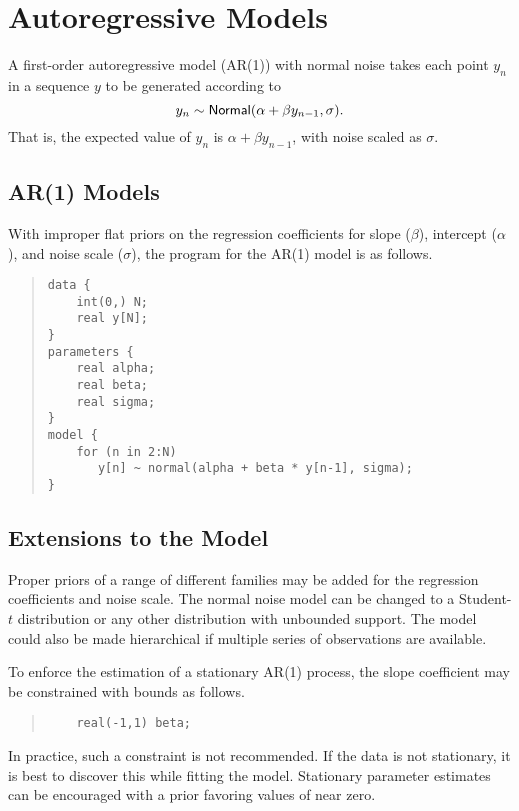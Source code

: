 \section{Autoregressive Models}

A first-order autoregressive model (AR(1)) with normal noise takes
each point $y_n$ in a sequence $y$ to be generated according to
%
\[
y_n \sim \mbox{\sf Normal}(\alpha + \beta y_{n-1}, \sigma).
\]
%
That is, the expected value of $y_n$ is $\alpha + \beta y_{n-1}$, with
noise scaled as $\sigma$.

\subsection{AR(1) Models}

With improper flat priors on the regression coefficients for slope
($\beta$), intercept ($\alpha$), and noise scale ($\sigma$),
the \Stan program for the AR(1) model is as follows.
%
\begin{quote}
\begin{Verbatim}
data {
    int(0,) N;
    real y[N];
}
parameters {
    real alpha;
    real beta;
    real sigma;
}
model {
    for (n in 2:N)
       y[n] ~ normal(alpha + beta * y[n-1], sigma);
}
\end{Verbatim}
\end{quote}
%

\subsection{Extensions to the Model} 

Proper priors of a range of different families may be added for the
regression coefficients and noise scale.  The normal noise model can
be changed to a Student-$t$ distribution or any other distribution
with unbounded support.  The model could also be made hierarchical if
multiple series of observations are available.  

To enforce the estimation of a stationary AR(1) process, the slope
coefficient  may be constrained with bounds as follows.
%
\begin{quote}
\begin{Verbatim}
    real(-1,1) beta;
\end{Verbatim}
\end{quote}
%
In practice, such a constraint is not recommended.  If the data is not
stationary, it is best to discover this while fitting the model.
Stationary parameter estimates can be encouraged with a prior favoring
values of  near zero.


